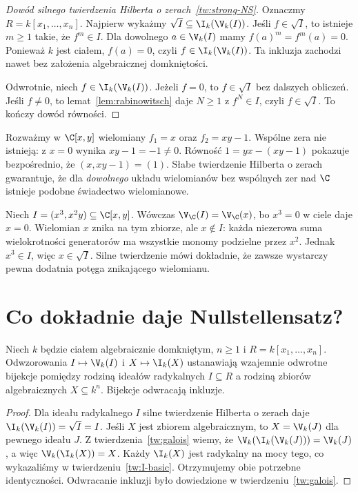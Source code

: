\begin{proof}[Dowód silnego twierdzenia Hilberta o zerach~\ref{tw:strong-NS}]
Oznaczmy $R=k[x_1,\dots,x_n]$.
Najpierw wykażmy $\sqrt I\subseteq\I_k(\V_k(I))$.
Jeśli $f\in\sqrt I$, to istnieje $m\ge1$ takie,
że $f^m\in I$. Dla dowolnego $a\in\V_k(I)$ mamy
$f(a)^m=f^m(a)=0$. Ponieważ $k$ jest ciałem,
$f(a)=0$, czyli $f\in\I_k(\V_k(I))$.
Ta inkluzja zachodzi nawet bez założenia algebraicznej domkniętości.

Odwrotnie, niech $f\in\I_k(\V_k(I))$.
Jeżeli $f=0$, to $f\in\sqrt I$ bez dalszych obliczeń.
Jeśli $f\ne0$, to lemat~\ref{lem:rabinowitsch}
daje $N\ge1$ z $f^N\in I$, czyli $f\in\sqrt I$.
To kończy dowód równości.
\end{proof}

\begin{przyklad}
Rozważmy w $\C[x,y]$ wielomiany $f_1=x$ oraz
$f_2=xy-1$. Wspólne zera nie istnieją: z $x=0$
wynika $xy-1=-1\ne0$.
Równość $1=yx-(xy-1)$ pokazuje bezpośrednio,
że $(x,xy-1)=(1)$.
Słabe twierdzenie Hilberta o zerach gwarantuje,
że dla \emph{dowolnego} układu wielomianów bez wspólnych
zer nad $\C$ istnieje podobne świadectwo wielomianowe.
\end{przyklad}

\begin{przyklad}
Niech $I=(x^3,x^2y)\subseteq\C[x,y]$.
Wówczas $\V_{\C}(I)=\V_{\C}(x)$, bo $x^3=0$
w ciele daje $x=0$. Wielomian $x$ znika na tym zbiorze,
ale $x\notin I$: każda niezerowa suma wielokrotności
generatorów ma wszystkie monomy podzielne przez $x^2$.
Jednak $x^3\in I$, więc $x\in\sqrt I$.
Silne twierdzenie mówi dokładnie, że zawsze wystarczy
pewna dodatnia potęga znikającego wielomianu.
\end{przyklad}

\section{Co dokładnie daje Nullstellensatz?}

\begin{twierdzenie}
\label{tw:radical-correspondence}
Niech $k$ będzie ciałem algebraicznie domkniętym, $n\ge1$
i $R=k[x_1,\dots,x_n]$.
Odwzorowania $I\mapsto\V_k(I)$ i $X\mapsto\I_k(X)$
ustanawiają wzajemnie odwrotne bijekcje pomiędzy rodziną
ideałów radykalnych $I\subseteq R$ a rodziną
zbiorów algebraicznych $X\subseteq k^n$.
Bijekcje odwracają inkluzje.
\end{twierdzenie}
\begin{proof}
Dla ideału radykalnego $I$ silne twierdzenie Hilberta o zerach
daje $\I_k(\V_k(I))=\sqrt I=I$.
Jeśli $X$ jest zbiorem algebraicznym, to $X=\V_k(J)$
dla pewnego ideału $J$. Z twierdzenia~\ref{tw:galois}
wiemy, że $\V_k(\I_k(\V_k(J)))=\V_k(J)$,
a więc $\V_k(\I_k(X))=X$.
Każdy $\I_k(X)$ jest radykalny na mocy
tego, co wykazaliśmy w twierdzeniu~\ref{tw:I-basic}.
Otrzymujemy obie potrzebne identyczności.
Odwracanie inkluzji było dowiedzione w twierdzeniu~\ref{tw:galois}.
\end{proof}

